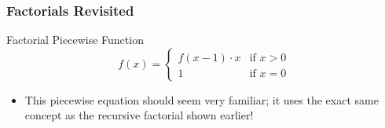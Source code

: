 \documentclass[fleqn, t]{beamer}
\begin{document}
\begin{frame}
  \frametitle{Factorials Revisited}
  \begin{block}{Factorial Piecewise Function}
    \begin{equation*}
      f(x) = 
      \begin{cases}
        f(x - 1) \cdot x & \text{if } x > 0\\
        1 & \text{if } x = 0
      \end{cases}
    \end{equation*}
  \end{block}
  \begin{itemize}[<+->]
  \item This piecewise equation should seem very familiar; it uses the exact
    same concept as the recursive factorial shown earlier!
  \end{itemize}
  \begin{figure}
  \end{figure}
\end{frame}
\end{document}
